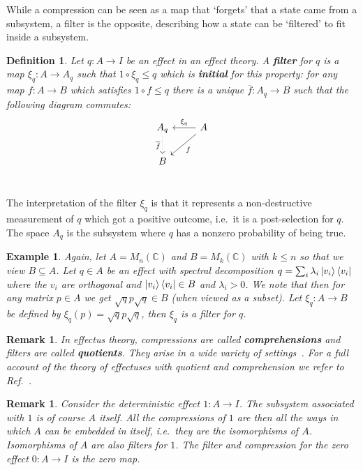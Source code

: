 \documentclass[b5paper,onecolumn,12pt,accepted=2019-05-03, issue=1, volume=1, shorttitle=papers/compositionality-1-1]{compositionalityarticle}
\newcounter{counter}
\numberwithin{counter}{section}
\newtheorem{definition}[counter]{Definition}
\newtheorem{remark}[counter]{Remark}
\newtheorem{example}[counter]{Example}
\newcommand{\C}{\mathbb{C}}
\newcommand{\cl}[1]{\overline{#1}}
\begin{document}
While a compression can be seen as a map that `forgets' that a state came from a subsystem, a filter is the opposite, describing how a state can be `filtered' to fit inside a subsystem.


\begin{definition}\label{def:filter}
    Let $q:A\rightarrow I$ be an effect in an effect theory. A \textbf{filter} for $q$ is a map $\xi_q:A\rightarrow A_q$ such that $1\circ\xi_q\leq q$ which is \textbf{initial} for this property: for any map $f:A\rightarrow B$ which satisfies $1\circ f\leq q$ there is a unique $\cl{f}:A_q\rightarrow B$ such that the following diagram commutes:
    \[\begin{tikzcd}[ampersand replacement = \&]
    A_q \arrow[dotted,swap]{d}{\cl{f}}\&\arrow[swap]{l}{\xi_q} A\arrow{dl}{f} \\
     B\&  \\
    \end{tikzcd}\]
\end{definition}

\noindent The interpretation of the filter $\xi_q$ is that it represents a non-destructive measurement of $q$ which got a positive outcome, i.e.\ it is a post-selection for $q$. The space $A_q$ is the subsystem where $q$ has a nonzero probability of being true.

\begin{example}
    Again, let $A=M_n(\C)$ and $B=M_k(\C)$ with $k\leq n$ so that we view $B\subseteq A$. Let $q\in A$ be an effect with spectral decomposition $q=\sum_i \lambda_i \ket{v_i}\bra{v_i}$ where the $v_i$ are orthogonal and $\ket{v_i}\bra{v_i}\in B$ and $\lambda_i > 0$. We note that then for any matrix $p\in A$ we get $\sqrt{q}p\sqrt{q}\in B$ (when viewed as a subset). Let $\xi_q: A\rightarrow B$ be defined by $\xi_q(p) = \sqrt{q}p\sqrt{q}$, then $\xi_q$ is a filter for $q$.
\end{example}

\begin{remark}
    In effectus theory, compressions are called \textbf{comprehensions} and filters are called \textbf{quotients}. They arise in a wide variety of settings~\cite{cho2015quotient}. For a full account of the theory of effectuses with quotient and comprehension we refer to Ref.~\cite{basthesis}.
\end{remark}

\begin{remark}
    Consider the deterministic effect $1:A\rightarrow I$. The subsystem associated with $1$ is of course $A$ itself. All the compressions of $1$ are then all the ways in which $A$ can be embedded in itself, i.e.\ they are the isomorphisms of $A$. Isomorphisms of $A$ are also filters for $1$. The filter and compression for the zero effect $0:A\rightarrow I$ is the zero map.
\end{remark}
\end{document}
